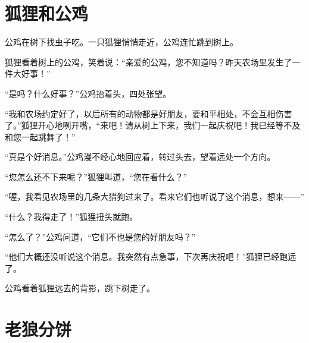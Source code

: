\documentclass[12pt,UTF-8,openany]{ctexbook}
\begin{document}
\chapter{狐狸和公鸡}

\begin{Large}
    
    公鸡在树下找虫子吃。一只狐狸悄悄走近，公鸡连忙跳到树上。
    
    狐狸看着树上的公鸡，笑着说：“亲爱的公鸡，您不知道吗？昨天农场里发生了一件大好事！”
    
    “是吗？什么好事？”公鸡抬着头，四处张望。
    
    “我和农场约定好了，以后所有的动物都是好朋友，要和平相处，不会互相伤害了。”狐狸开心地咧开嘴，“来吧！请从树上下来，我们一起庆祝吧！我已经等不及和您一起跳舞了！”
    
    “真是个好消息。”公鸡漫不经心地回应着，转过头去，望着远处一个方向。
    
    “您怎么还不下来呢？”狐狸叫道，“您在看什么？”
    
    “喔，我看见农场里的几条大猎狗过来了。看来它们也听说了这个消息，想来——”
    
    “什么？我得走了！”狐狸扭头就跑。
    
    “怎么了？”公鸡问道，“它们不也是您的好朋友吗？”
    
    “他们大概还没听说这个消息。我突然有点急事，下次再庆祝吧！”狐狸已经跑远了。
    
    公鸡看着狐狸远去的背影，跳下树走了。
    
\end{Large}

\chapter{老狼分饼}
\end{document}
